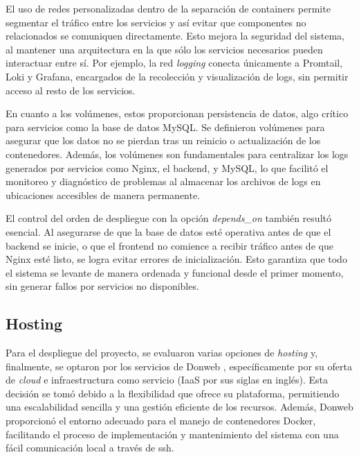 {El uso de redes personalizadas dentro de la separación de containers permite segmentar el tráfico entre los servicios y así evitar que componentes no relacionados se comuniquen directamente. Esto mejora la seguridad del sistema, al mantener una arquitectura en la que sólo los servicios necesarios pueden interactuar entre sí. Por ejemplo, la red \textit{logging} conecta únicamente a Promtail, Loki y Grafana, encargados de la recolección y visualización de logs, sin permitir acceso al resto de los servicios.

En cuanto a los volúmenes, estos proporcionan persistencia de datos, algo crítico para servicios como la base de datos MySQL. Se definieron volúmenes para asegurar que los datos no se pierdan tras un reinicio o actualización de los contenedores. Además, los volúmenes son fundamentales para centralizar los logs generados por servicios como Nginx, el backend, y MySQL, lo que facilitó el monitoreo y diagnóstico de problemas al almacenar los archivos de logs en ubicaciones accesibles de manera permanente.

El control del orden de despliegue con la opción \textit{depends\_on} también resultó esencial. Al asegurarse de que la base de datos esté operativa antes de que el backend se inicie, o que el frontend no comience a recibir tráfico antes de que Nginx esté listo, se logra evitar errores de inicialización. Esto garantiza que todo el sistema se levante de manera ordenada y funcional desde el primer momento, sin generar fallos por servicios no disponibles.

\subsection{Hosting}

Para el despliegue del proyecto, se evaluaron varias opciones de \textit{hosting} y, finalmente, se optaron por los servicios de Donweb \citep{DonwebWebsite}, específicamente por su oferta de \textit{cloud} e infraestructura como servicio (IaaS por sus siglas en inglés). Esta decisión se tomó debido a la flexibilidad que ofrece su plataforma, permitiendo una escalabilidad sencilla y una gestión eficiente de los recursos. Además, Donweb proporcionó el entorno adecuado para el manejo de contenedores Docker, facilitando el proceso de implementación y mantenimiento del sistema con una fácil comunicación local a través de ssh.

}
